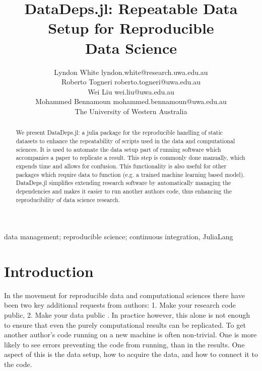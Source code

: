 \documentclass[twoside,11pt]{article}\usepackage{jmlr2e}
\begin{document}
\title{DataDeps.jl: Repeatable Data Setup for Reproducible\\ Data Science}
\author{%
	\name Lyndon White \email lyndon.white@research.uwa.edu.au\\
	\name Roberto Togneri \email roberto.togneri@uwa.edu.au\\
	\name Wei Liu \email wei.liu@uwa.edu.au\\
	\name Mohammed Bennamoun \email mohammed.bennamoun@uwa.edu.au\\
	The University of Western Australia 
}
\editor{}


\maketitle

\begin{abstract}
	We present DataDeps.jl: a julia package for the reproducible handling of static datasets to enhance the repeatability of scripts used in the data and computational sciences.
	It is used to automate the data setup part of running software which accompanies a paper to replicate a result.
	This step is commonly done manually, which expends time and allows for confusion.
	This functionality is also useful for other packages which require data to function (e.g. a trained machine learning based model).
	DataDeps.jl simplifies extending research software by automatically managing the dependencies and makes it easier to run another authors code, thus enhancing the reproducibility of data science research.
\end{abstract}

\begin{keywords}
data management;  reproducible science; continuous integration, JuliaLang
\end{keywords}

\section{Introduction}

In the movement for reproducible data and computational sciences there have been two key additional requests from authors:
1. Make your research code public, 2. Make your data public \citep{lookafterdata}.
In practice however, this alone is not enough to ensure that even the purely computational results can be replicated.
To get another author's code running on a new machine is often non-trivial.
One is more likely to see errors preventing the code from running, than in the results.
One aspect of this is the data setup, how to acquire the data, and how to connect it to the code.
\end{document}
